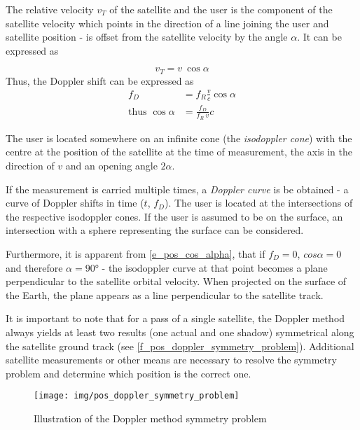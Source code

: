 The relative velocity $v_T$ of the satellite and the user is the component of the satellite velocity which points in the direction of a line joining the user and satellite position - is offset from the satellite velocity by the angle $\alpha$. It can be expressed as

\begin{equation*}
    v_T = v \ \cos{\alpha}
\end{equation*}
Thus, the Doppler shift can be expressed as
\begin{align}
    \label{e_pos_fd_alpha}
    f_D &= f_R \frac{v}{c} \cos{\alpha} \\
    \label{e_pos_cos_alpha}
    \text{thus } \cos{\alpha} &= \frac{f_D}{f_R \ v}c
\end{align}

The user is located somewhere on an infinite cone (the \textit{isodoppler cone}) with the centre at the position of the satellite at the time of measurement, the axis in the direction of $v$ and an opening angle $2\alpha$.

If the measurement is carried multiple times, a \textit{Doppler curve} is be obtained - a curve of Doppler shifts in time ($t$, $f_D$). The user is located at the intersections of the respective isodoppler cones. If the user is assumed to be on the surface, an intersection with a sphere representing the surface can be considered.

Furthermore, it is apparent from \autoref{e_pos_cos_alpha}, that if $f_D = 0$, $cos \alpha = 0$ and therefore $\alpha = \ang{90}$ - the isodoppler curve at that point becomes a plane perpendicular to the satellite orbital velocity. When projected on the surface of the Earth, the plane appears as a line perpendicular to the satellite track.

It is important to note that for a pass of a single satellite, the Doppler method always yields at least two results (one actual and one shadow) symmetrical along the satellite ground track (see \autoref{f_pos_doppler_symmetry_problem}). Additional satellite measurements or other means are necessary to resolve the symmetry problem and determine which position is the correct one.

\begin{figure}
    \centering
    \texttt{[image: img/pos\_doppler\_symmetry\_problem]}
    \caption{Illustration of the Doppler method symmetry problem\cite{sop09}}
    \label{f_pos_doppler_symmetry_problem}
\end{figure}



